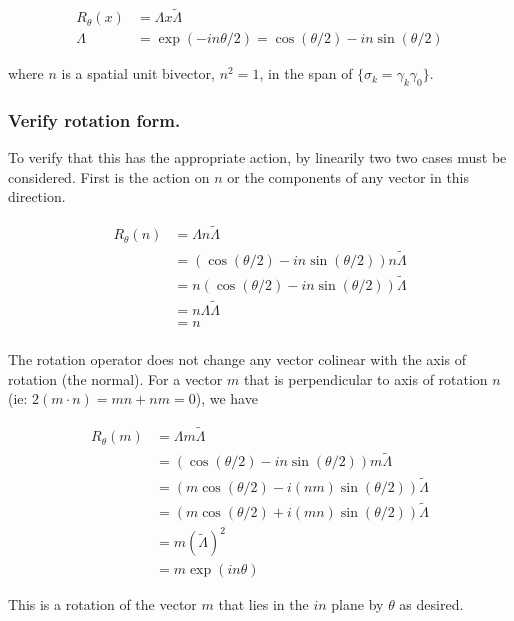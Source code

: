 \documentclass{article}
\newcommand{\reverse}[1]{\tilde{{#1}}}
\begin{document}
\begin{align*}
R_\theta(x) &= \Lambda x \reverse{\Lambda} \\
\Lambda &= \exp( -i n \theta/ 2 ) = \cos( \theta/ 2 ) - i n \sin( \theta/ 2 )
\end{align*}

where $n$ is a spatial unit bivector, $n^2 = 1$, in the span of $\{\sigma_k = \gamma_k \gamma_0\}$.

\subsubsection{ Verify rotation form. }

To verify that this has the appropriate action, by linearily two two cases must be considered.  
First is the action on $n$ or the components of any vector in this direction.

\begin{align*}
R_\theta(n) 
&= \Lambda n \reverse{\Lambda} \\
&= \left( \cos( \theta/ 2 ) - i n \sin( \theta/ 2 ) \right) n \reverse{\Lambda} \\
&= n \left( \cos( \theta/ 2 ) - i n \sin( \theta/ 2 ) \right) \reverse{\Lambda} \\
&= n \Lambda \reverse{\Lambda} \\
&= n \\
\end{align*}

The rotation operator does not change any vector colinear with the axis of rotation (the normal).  For a 
vector $m$ that is perpendicular to axis of rotation $n$ (ie: $2 ( m \cdot n ) = mn + nm = 0 $), we have

\begin{align*}
R_\theta(m) 
&= \Lambda m \reverse{\Lambda} \\
&= \left( \cos( \theta/ 2 ) - i n \sin( \theta/ 2 ) \right) m \reverse{\Lambda} \\
&= \left( m \cos( \theta/ 2 ) - i (n m) \sin( \theta/ 2 ) \right) \reverse{\Lambda} \\
&= \left( m \cos( \theta/ 2 ) + i (m n) \sin( \theta/ 2 ) \right) \reverse{\Lambda} \\
&= m (\reverse{\Lambda})^2 \\
&= m \exp( i n \theta )
\end{align*}

This is a rotation of the vector $m$ that lies in the $i n$ plane by $\theta$ as desired.
\end{document}

